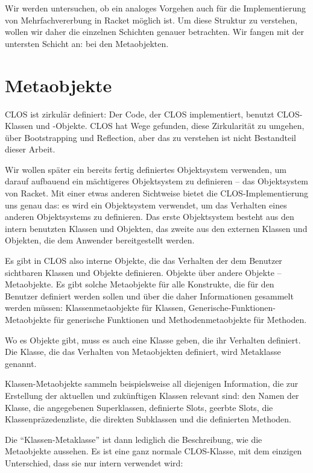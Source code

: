 Wir werden untersuchen, ob ein analoges Vorgehen auch für die Implementierung von Mehrfachvererbung in Racket möglich ist. Um diese Struktur zu verstehen, wollen wir daher die einzelnen Schichten genauer betrachten. Wir fangen mit der untersten Schicht an: bei den Metaobjekten.

\section{Metaobjekte}
CLOS ist zirkulär definiert: Der Code, der CLOS implementiert, benutzt CLOS-Klassen und -Objekte. CLOS hat Wege gefunden, diese Zirkularität zu umgehen, über Bootstrapping und Reflection, aber das zu verstehen ist nicht Bestandteil dieser Arbeit. 

Wir wollen später ein bereits fertig definiertes Objektsystem verwenden, um darauf aufbauend ein mächtigeres Objektsystem zu definieren -- das Objektsystem von Racket. Mit einer etwas anderen Sichtweise bietet die CLOS-Implementierung uns genau das: es wird ein Objektsystem verwendet, um das Verhalten eines anderen Objektsystems zu definieren. Das erste Objektsystem besteht aus den intern benutzten Klassen und Objekten, das zweite aus den externen Klassen und Objekten, die dem Anwender bereitgestellt werden.

Es gibt in CLOS also interne Objekte, die das Verhalten der dem Benutzer sichtbaren Klassen und Objekte definieren. Objekte über andere Objekte -- Metaobjekte. Es gibt solche Metaobjekte für alle Konstrukte, die für den Benutzer definiert werden sollen und über die daher Informationen gesammelt werden müssen: Klassenmetaobjekte für Klassen, Generische-Funktionen-Metaobjekte für generische Funktionen und Methodenmetaobjekte für Methoden. 

Wo es Objekte gibt, muss es auch eine Klasse geben, die ihr Verhalten definiert. Die Klasse, die das Verhalten von Metaobjekten definiert, wird Metaklasse genannt. 

Klassen-Metaobjekte sammeln beispielsweise all diejenigen Information, die zur Erstellung der aktuellen und zukünftigen Klassen relevant sind: den Namen der Klasse, die angegebenen Superklassen, definierte Slots, geerbte Slots, die Klassenpräzedenzliste, die direkten Subklassen und die definierten Methoden. 

Die ``Klassen-Metaklasse'' ist dann lediglich die Beschreibung, wie die Metaobjekte aussehen. Es ist eine ganz normale CLOS-Klasse, mit dem einzigen Unterschied, dass sie nur intern verwendet wird:

